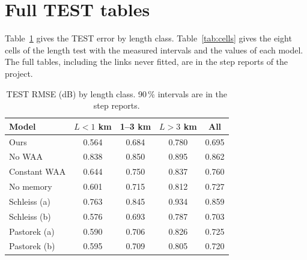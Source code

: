 \documentclass[reprint,aps,pra,amsmath,amssymb,nofootinbib,superscriptaddress]{revtex4-2}
\begin{document}
\section{Full TEST tables}
\label{app:tables}
Table~\ref{tab:fullrmse} gives the TEST error by length class. Table~\ref{tab:cells} gives the eight cells of the length test
with the measured intervals and the values of each model. The full tables, including the links never fitted, are in the
step reports of the project.

\begin{table}[t]
\caption{TEST RMSE (dB) by length class. 90\,\% intervals are in the step reports.}
\label{tab:fullrmse}
\begin{ruledtabular}
\begin{tabular}{lcccc}
Model & $L<1$ km & 1--3 km & $L>3$ km & All\\
\hline
Ours & 0.564 & 0.684 & 0.780 & 0.695\\
No WAA & 0.838 & 0.850 & 0.895 & 0.862\\
Constant WAA & 0.644 & 0.750 & 0.837 & 0.760\\
No memory & 0.601 & 0.715 & 0.812 & 0.727\\
Schleiss (a) & 0.763 & 0.845 & 0.934 & 0.859\\
Schleiss (b) & 0.576 & 0.693 & 0.787 & 0.703\\
Pastorek (a) & 0.590 & 0.706 & 0.826 & 0.725\\
Pastorek (b) & 0.595 & 0.709 & 0.805 & 0.720\\
\end{tabular}
\end{ruledtabular}
\end{table}
\end{document}

